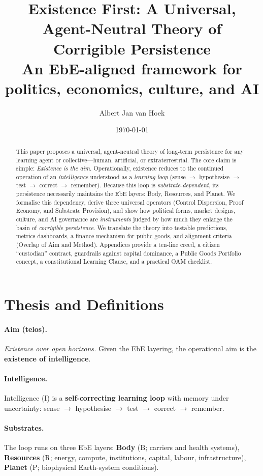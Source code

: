\documentclass[11pt,a4paper]{article}
\title{\textbf{Existence First: A Universal, Agent-Neutral Theory of Corrigible Persistence}\\
\large An EbE-aligned framework for politics, economics, culture, and AI}
\author{Albert Jan van Hoek}
\date{\today}
\newcommand{\defterm}[1]{\textbf{#1}}
\newcommand{\B}{\mathrm{B}} %
\newcommand{\R}{\mathrm{R}} %
\newcommand{\Pplanet}{\mathrm{P}} %
\newcommand{\I}{\mathrm{I}} %
\begin{document}
\maketitle

\begin{abstract}
\noindent
This paper proposes a universal, agent-neutral theory of long-term persistence for any learning agent or collective---human, artificial, or extraterrestrial. The core claim is simple: \emph{Existence is the aim}. Operationally, existence reduces to the continued operation of an \emph{intelligence} understood as a \emph{learning loop} (sense $\rightarrow$ hypothesise $\rightarrow$ test $\rightarrow$ correct $\rightarrow$ remember). Because this loop is \emph{substrate-dependent}, its persistence necessarily maintains the EbE layers: Body, Resources, and Planet. We formalise this dependency, derive three universal operators (Control Dispersion, Proof Economy, and Substrate Provision), and show how political forms, market designs, culture, and AI governance are \emph{instruments} judged by how much they enlarge the basin of \emph{corrigible persistence}. We translate the theory into testable predictions, metrics dashboards, a finance mechanism for public goods, and alignment criteria (Overlap of Aim and Method). Appendices provide a ten-line creed, a citizen “custodian” contract, guardrails against capital dominance, a Public Goods Portfolio concept, a constitutional Learning Clause, and a practical OAM checklist.
\end{abstract}

\section{Thesis and Definitions}
\label{sec:thesis}

\paragraph{Aim (telos).} \emph{Existence over open horizons.} Given the EbE layering, the operational aim is the \defterm{existence of intelligence}.

\paragraph{Intelligence.} Intelligence ($\I$) is a \defterm{self-correcting learning loop} with memory under uncertainty: sense $\to$ hypothesise $\to$ test $\to$ correct $\to$ remember.

\paragraph{Substrates.} The loop runs on three EbE layers:
\defterm{Body} ($\B$; carriers and health systems), 
\defterm{Resources} ($\R$; energy, compute, institutions, capital, labour, infrastructure),
\defterm{Planet} ($\Pplanet$; biophysical Earth-system conditions).
\end{document}
